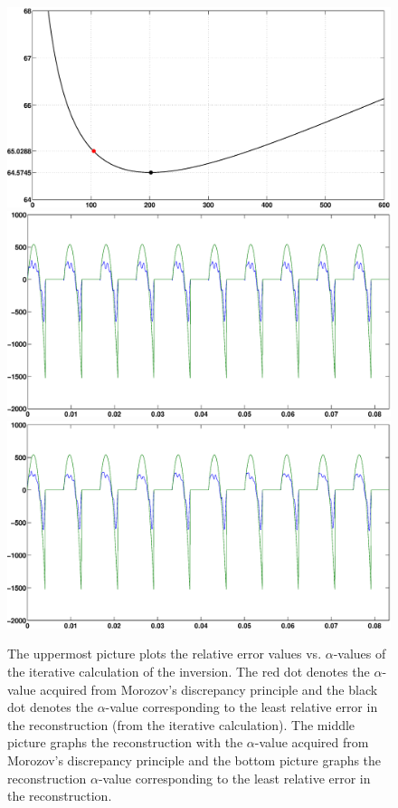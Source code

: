 \documentclass[12pt,a4]{article}
\begin{document}
\begin{figure}[H]
\begin{center}
\includegraphics[scale=.3]{img/alpha_errs_iter.eps}
\includegraphics[scale=.3]{img/Comparison_with_iterative_nocrime.eps}
\includegraphics[scale=.3]{img/Comparison-201.eps}
\end{center}
\caption{The uppermost picture plots the relative error values vs. $\alpha$-values of the iterative calculation of the inversion. The red dot denotes the $\alpha$-value acquired from Morozov's discrepancy principle and the black dot denotes the $\alpha$-value corresponding to the least relative error in the reconstruction (from the iterative calculation). The middle picture graphs the reconstruction with the $\alpha$-value acquired from Morozov's discrepancy principle and the bottom picture graphs the reconstruction $\alpha$-value corresponding to the least relative error in the reconstruction.}
\label{fig:iter_comparison}
\end{figure}
\end{document}
